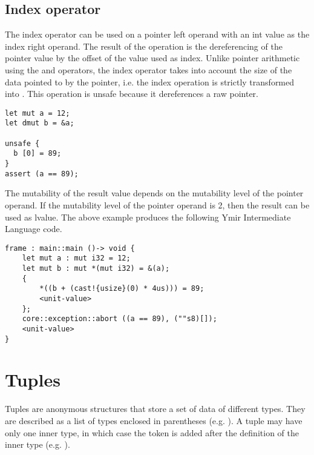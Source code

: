 \subsection {Index operator}

The index operator can be used on a pointer left operand with an int value as
the index right operand. The result of the operation is the dereferencing of the
pointer value by the offset of the value used as index. Unlike pointer
arithmetic using the \token{+} and \token{-} operators, the index operator
takes into account the size of the data pointed to by the pointer, i.e. the
index operation  is strictly transformed into . This operation is unsafe
because it dereferences a raw pointer.

\smallskip

\begin{lstlisting}[style=coloredverbatim]
let mut a = 12;
let dmut b = &a;

unsafe {
  b [0] = 89;
}
assert (a == 89);
\end{lstlisting}

\smallskip

The mutability of the result value depends on the mutability level of the
pointer operand. If the mutability level of the pointer operand is 2, then the
result can be used as lvalue. The above example produces the following Ymir Intermediate Language code.

\begin{lstlisting}[style=intermediateVerb]
frame : main::main ()-> void {
    let mut a : mut i32 = 12;
    let mut b : mut *(mut i32) = &(a);
    {
        *((b + (cast!{usize}(0) * 4us))) = 89;
        <unit-value>
    };
    core::exception::abort ((a == 89), (""s8)[]);
    <unit-value>
}
\end{lstlisting}

\vfill%
\pagebreak

\section {Tuples}

Tuples are anonymous structures that store a set of data of different types.
They are described as a list of types enclosed in parentheses (e.g.
). A tuple may have only one inner type, in which case
the token \token{,} is added after the definition of the inner type (e.g.
).


